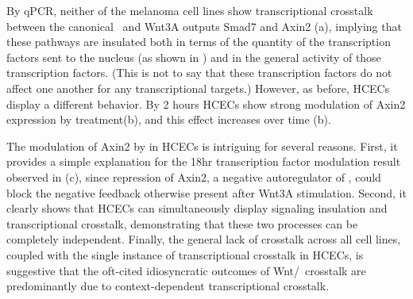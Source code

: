 By qPCR, neither of the melanoma cell lines show transcriptional
crosstalk between the canonical \tgfbsf\
and Wnt3A outputs Smad7 and Axin2
(a), implying that these pathways
are insulated both in terms of the quantity of the transcription factors
sent to the nucleus (as shown in \ar{fig:insulation:wntTgfbInsulation})
and in the general activity of those
transcription factors. (This is not to say that these transcription factors
do not affect one another for any transcriptional targets.)
However, as before, HCECs display a different behavior.
By 2 hours HCECs show strong modulation of Axin2 expression
by  treatment(b),
and this effect increases over time
(b).


The modulation of Axin2 by  in HCECs is intriguing for
several reasons. First, it provides a simple explanation for the
18hr transcription factor modulation result observed in
(c), since repression of Axin2,
a negative autoregulator of \bcat, could block the negative feedback
otherwise present after Wnt3A stimulation. Second, it clearly
shows that HCECs can simultaneously display signaling insulation
and transcriptional crosstalk,
demonstrating that these two processes can be completely
independent. Finally, the general lack of crosstalk across all
cell lines, coupled with the single instance of transcriptional
crosstalk in HCECs, is suggestive that the oft-cited idiosyncratic
outcomes of Wnt/\tgfbsf\ crosstalk are predominantly due to
context-dependent transcriptional crosstalk.

